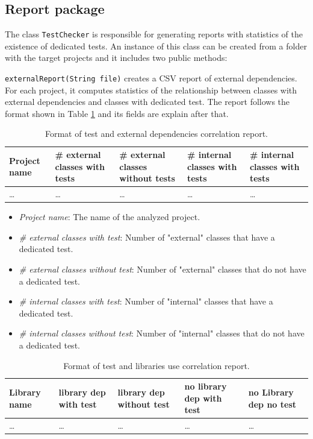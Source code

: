 \documentclass[11pt, a4paper, twocolumn]{article}
\begin{document}
\subsection{Report package}
The class \texttt{TestChecker} is responsible for generating reports with statistics of the existence of dedicated tests. An instance of this class can be created from a folder with the target projects and it includes two public methods:
\begin{description}

\item{\texttt{externalReport(String file)}} creates a CSV report of external dependencies. For each project, it computes statistics of the relationship between classes with external dependencies and classes with dedicated test. The report follows the format shown in Table \ref{table:external_test} and its fields are explain after that.

\begin{table}[t] \centering
\begin{tabular}{ | m{5em} | m{8em} | m{8em} | m{7.5em} | m{7.5em} |}
\hline Project name & \# external classes with tests & \# external classes without tests & \# internal classes with tests & \# internal classes with tests \\
\hline \ldots & \ldots & \ldots & \ldots & \ldots \\
\hline
\end{tabular}
\caption{Format of test and external dependencies correlation report.}
\label{table:external_test}
\end{table}

\begin{itemize}
\item \textit{Project name}: The name of the analyzed project.
\item \textit{\# external classes with test}: Number of "external" classes that have a dedicated test.
\item \textit{\# external classes without test}: Number of "external" classes that do not have a dedicated test.
\item \textit{\# internal classes with test}: Number of "internal" classes that have a dedicated test.
\item \textit{\# internal classes without test}: Number of "internal" classes that do not have a dedicated test.
\end{itemize}


\begin{table}[t] \centering
\begin{tabular}{ | m{5em} | m{7em} | m{7em} | m{7em} | m{7em} |}
\hline Library name & library dep with test & library dep without test & no library dep with test & no Library dep no test\\
\hline \ldots & \ldots & \ldots & \ldots & \ldots \\
\hline
\end{tabular}
\caption{Format of test and libraries use correlation report.}
\label{table:libraries}
\end{table}


\end{description}
\end{document}
